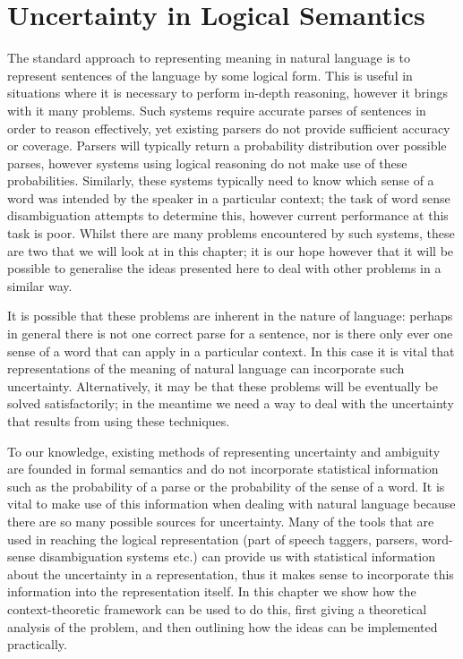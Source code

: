 
%

%


\chapter{Uncertainty in Logical Semantics}
\label{model-theoretic-chapter}

The standard approach to representing meaning in natural language is to represent sentences of the language by some logical form. This is useful in situations where it is necessary to perform in-depth reasoning, however it brings with it many problems. Such systems require accurate parses of sentences in order to reason effectively, yet existing parsers do not provide sufficient accuracy or coverage. Parsers will typically return a probability distribution over possible parses, however systems using logical reasoning do not make use of these probabilities. Similarly, these systems typically need to know which sense of a word was intended by the speaker in a particular context; the task of word sense disambiguation attempts to determine this, however current performance at this task is poor. Whilst there are many problems encountered by such systems, these are two that we will look at in this chapter; it is our hope however that it will be possible to generalise the ideas presented here to deal with other problems in a similar way.

It is possible that these problems are inherent in the nature of language: perhaps in general there is not one correct parse for a sentence, nor is there only ever one sense of a word that can apply in a particular context. In this case it is vital that representations of the meaning of natural language can incorporate such uncertainty. Alternatively, it may be that these problems will be eventually be solved satisfactorily; in the meantime we need a way to deal with the uncertainty that results from using these techniques.

To our knowledge, existing methods of representing uncertainty and ambiguity are founded in formal semantics and do not incorporate statistical information such as the probability of a parse or the probability of the sense of a word. It is vital to make use of this information when dealing with natural language because there are so many possible sources for uncertainty. Many of the tools that are used in reaching the logical representation (part of speech taggers, parsers, word-sense disambiguation systems etc.) can provide us with statistical information about the uncertainty in a representation, thus it makes sense to incorporate this information into the representation itself. In this chapter we show how the context-theoretic framework can be used to do this, first giving a theoretical analysis of the problem, and then outlining how the ideas can be implemented practically.

